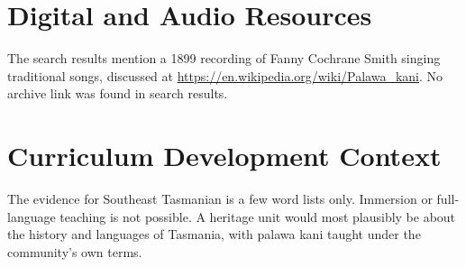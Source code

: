 \documentclass[12pt]{article}
\begin{document}
\section{Digital and Audio Resources}
The search results mention a 1899 recording of Fanny Cochrane Smith singing traditional songs, discussed at \url{https://en.wikipedia.org/wiki/Palawa_kani}. No archive link was found in search results.

\section{Curriculum Development Context}
The evidence for Southeast Tasmanian is a few word lists only. Immersion or full-language teaching is not possible. A heritage unit would most plausibly be about the history and languages of Tasmania, with palawa kani taught under the community's own terms.
\end{document}
